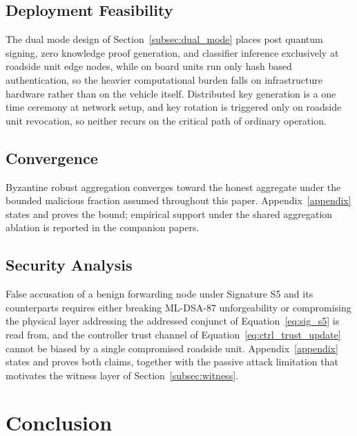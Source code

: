 \documentclass[lettersize,journal]{IEEEtran}
\theoremstyle{plain}
\theoremstyle{remark}
\begin{document}
	\subsection{Deployment Feasibility}
	The dual mode design of Section~\ref{subsec:dual_mode} places
	post quantum signing, zero knowledge proof generation, and classifier
	inference exclusively at roadside unit edge nodes, while on board units
	run only hash based authentication, so the heavier computational
	burden falls on infrastructure hardware rather than on the vehicle
	itself. Distributed key generation is a one time ceremony at network
	setup, and key rotation is triggered only on roadside unit revocation,
	so neither recurs on the critical path of ordinary operation.
	
	\subsection{Convergence}
	Byzantine robust aggregation converges toward the honest aggregate
	under the bounded malicious fraction assumed throughout this paper.
	Appendix~\ref{appendix} states and proves the bound; empirical support
	under the shared aggregation ablation is reported in the companion
	papers.
	
	\subsection{Security Analysis}
	False accusation of a benign forwarding node under Signature S5 and its
	counterparts requires either breaking ML-DSA-87 unforgeability or
	compromising the physical layer addressing the addressed conjunct of
	Equation~\eqref{eq:sig_s5} is read from, and the controller trust
	channel of Equation~\eqref{eq:ctrl_trust_update} cannot be biased by a
	single compromised roadside unit. Appendix~\ref{appendix} states and
	proves both claims, together with the passive attack limitation that
	motivates the witness layer of Section~\ref{subsec:witness}.
	
	
	\section{Conclusion}\label{conclusion}
	
\end{document}
